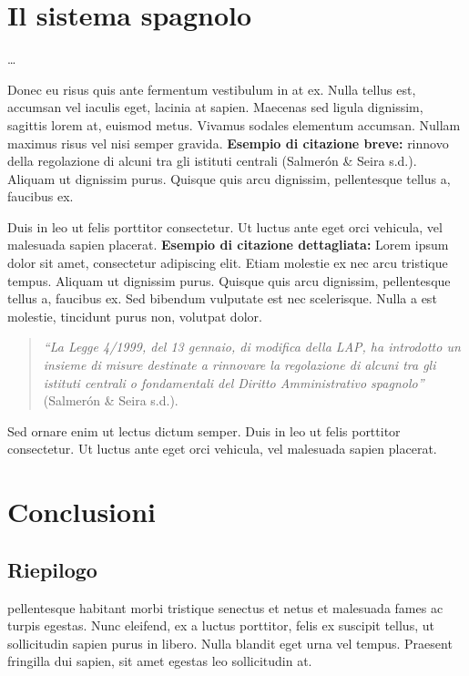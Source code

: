 \documentclass[12pt,it,a4paper,]{report}
\begin{document}
\hypertarget{il-sistema-spagnolo}{%
\chapter{Il sistema spagnolo}\label{il-sistema-spagnolo}}

\ldots{}

\newpage

Donec eu risus quis ante fermentum vestibulum in at ex. Nulla tellus
est, accumsan vel iaculis eget, lacinia at sapien. Maecenas sed ligula
dignissim, sagittis lorem at, euismod metus. Vivamus sodales elementum
accumsan. Nullam maximus risus vel nisi semper gravida. \textbf{Esempio
di citazione breve:} rinnovo della regolazione di alcuni tra gli
istituti centrali (Salmerón \& Seira s.d.). Aliquam ut dignissim purus.
Quisque quis arcu dignissim, pellentesque tellus a, faucibus ex.

Duis in leo ut felis porttitor consectetur. Ut luctus ante eget orci
vehicula, vel malesuada sapien placerat. \textbf{Esempio di citazione
dettagliata:} Lorem ipsum dolor sit amet, consectetur adipiscing elit.
Etiam molestie ex nec arcu tristique tempus. Aliquam ut dignissim purus.
Quisque quis arcu dignissim, pellentesque tellus a, faucibus ex. Sed
bibendum vulputate est nec scelerisque. Nulla a est molestie, tincidunt
purus non, volutpat dolor.

\begin{quote}
\emph{``La Legge 4/1999, del 13 gennaio, di modifica della LAP, ha
introdotto un insieme di misure destinate a rinnovare la regolazione di
alcuni tra gli istituti centrali o fondamentali del Diritto
Amministrativo spagnolo''} (Salmerón \& Seira s.d.).
\end{quote}

Sed ornare enim ut lectus dictum semper. Duis in leo ut felis porttitor
consectetur. Ut luctus ante eget orci vehicula, vel malesuada sapien
placerat.

\hypertarget{conclusioni}{%
\chapter{Conclusioni}\label{conclusioni}}

\hypertarget{riepilogo}{%
\section{Riepilogo}\label{riepilogo}}

pellentesque habitant morbi tristique senectus et netus et malesuada
fames ac turpis egestas. Nunc eleifend, ex a luctus porttitor, felis ex
suscipit tellus, ut sollicitudin sapien purus in libero. Nulla blandit
eget urna vel tempus. Praesent fringilla dui sapien, sit amet egestas
leo sollicitudin at.
\end{document}
